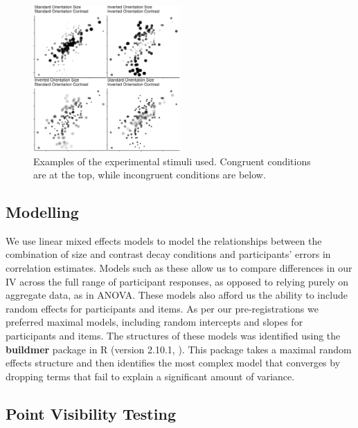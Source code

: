 \documentclass[manuscript, anonymous, screen]{acmart}
\begin{document}
\begin{figure}

\includegraphics[width=0.5\textwidth,height=\textheight]{size_and_contrast_new_files/figure-pdf/fig-examples-1.pdf} \hfill{}

\caption{\label{fig-examples}Examples of the experimental stimuli used.
Congruent conditions are at the top, while incongruent conditions are
below.}

\end{figure}

\hypertarget{sec-gen-modelling}{%
\subsection{Modelling}\label{sec-gen-modelling}}

We use linear mixed effects models to model the relationships between
the combination of size and contrast decay conditions and participants'
errors in correlation estimates. Models such as these allow us to
compare differences in our IV across the full range of participant
responses, as opposed to relying purely on aggregate data, as in ANOVA.
These models also afford us the ability to include random effects for
participants and items. As per our pre-registrations we preferred
maximal models, including random intercepts and slopes for participants
and items. The structures of these models was identified using the
\textbf{buildmer} package in R (version 2.10.1,
\citep{voeten_buildmer}). This package takes a maximal random effects
structure and then identifies the most complex model that converges by
dropping terms that fail to explain a significant amount of variance.

\hypertarget{sec-VT}{%
\subsection{Point Visibility Testing}\label{sec-VT}}
\end{document}
